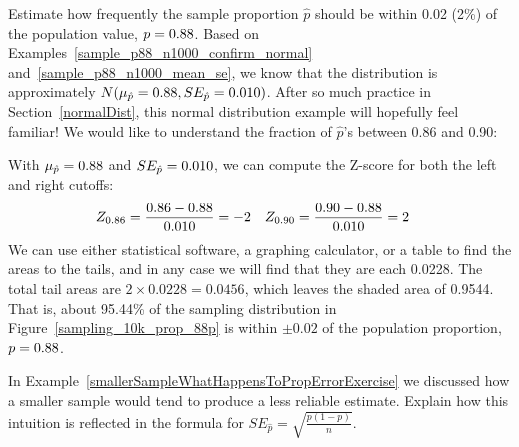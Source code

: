 \begin{examplewrap}
\begin{nexample}{Estimate how frequently the sample proportion
$\hat{p}$ should be within 0.02 (2\%) of the population value,
$p = 0.88{}$. Based on
Examples~\ref{sample_p88_n1000_confirm_normal}
and~\ref{sample_p88_n1000_mean_se},
we know that the distribution is approximately
$N(\mu_{\hat{p}} = 0.88{}, SE_{\hat{p}} = 0.010{})$.}
\label{sampling_10k_prop_887p-prop_from_867_to_907}
After so much practice in Section~\ref{normalDist},
this normal distribution example will hopefully feel familiar!
We would like to understand the fraction of $\hat{p}$'s
between 0.86 and 0.90:
\begin{center}
\end{center}
With $\mu_{\hat{p}} = 0.88{}$ and
$SE_{\hat{p}} = 0.010{}$,
we can compute the Z-score for both the left and right cutoffs:
\begin{align*}
Z_{0.86}
  &= \frac{0.86 - 0.88{}}{0.010{}}
  = -2
&Z_{0.90}
  &= \frac{0.90 - 0.88{}}{0.010{}}
  = 2
\end{align*}
We can use either statistical software, a graphing calculator,
or a table to find the areas to the tails, and in any case we
will find that they are each 0.0228. The total tail areas are
$2 \times 0.0228 = 0.0456$, which leaves the shaded area of
0.9544. That is, about 95.44\% of the sampling distribution
in Figure~\ref{sampling_10k_prop_88p} is within $\pm0.02$
of the population proportion, $p = 0.88{}$.
\end{nexample}
\end{examplewrap}

\D{\newpage}

\begin{exercisewrap}
\begin{nexercise}
In Example~\ref{smallerSampleWhatHappensToPropErrorExercise}
we discussed how a smaller sample would tend
to produce a less reliable estimate. Explain how this intuition
is reflected in the formula for
$SE_{\hat{p}} = \sqrt{\frac{p (1 - p)}{n}}$.\footnotemark
\end{nexercise}
\end{exercisewrap}


